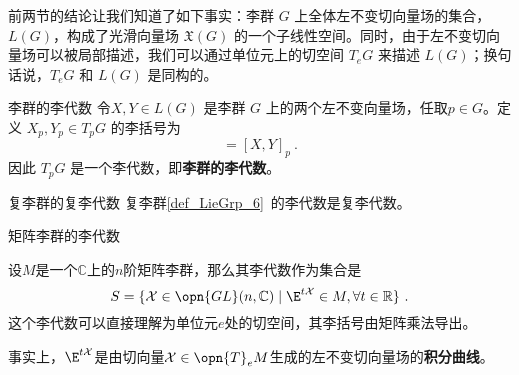 前两节的结论让我们知道了如下事实：李群 $G$ 上全体左不变切向量场的集合，$L(G)$，构成了光滑向量场 $\mathfrak{X}(G)$ 的一个子线性空间。同时，由于左不变切向量场可以被局部描述，我们可以通过单位元上的切空间 $T_eG$ 来描述 $L(G)$；换句话说，$T_eG$ 和 $L(G)$ 是同构的。

\begin{definition}{李群的李代数}
令$X, Y\in L(G)$ 是李群 $G$ 上的两个左不变向量场，任取$p\in G$。定义 $X_p, Y_p\in T_pG$ 的李括号为
\begin{equation}
[X_p, Y_p]=[X, Y]_p~.
\end{equation}
因此 $T_p G$ 是一个李代数，即\textbf{李群的李代数}。
\end{definition}


\begin{theorem}{复李群的复李代数}
复李群\autoref{def_LieGrp_6}~的李代数是复李代数。
\end{theorem}



\begin{example}{矩阵李群的李代数}

设$M$是一个$\mathbb{C}$上的$n$阶矩阵李群，那么其李代数作为集合是
\begin{equation}
S = \{ \mathcal{X}\in \opn{GL}(n, \mathbb{C}) \mid \E^{t\mathcal{X}}\in M, \forall t\in\mathbb{R} \}~.
\end{equation}
这个李代数可以直接理解为单位元$e$处的切空间，其李括号由矩阵乘法导出。

事实上，$\E^{t\mathcal{X}}$是由切向量$\mathcal{X}\in\opn{T}_e M$生成的左不变切向量场的\textbf{积分曲线}。

\end{example}























